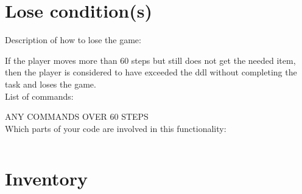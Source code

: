 \documentclass[11pt]{article}
\begin{document}
\section*{Lose condition(s)}
Description of how to lose the game:

If the player moves more than 60 steps but still does not get the needed item, then the player is considered to have exceeded the ddl without completing the task and loses the game.\\
List of commands:

ANY COMMANDS OVER 60 STEPS\\
Which parts of your code are involved in this functionality:
\begin{lstlisting}

\end{lstlisting}
\section*{Inventory}
\end{document}
